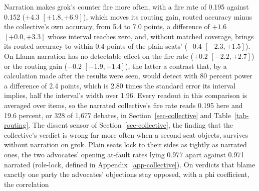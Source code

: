 Narration makes grok's counter fire more often, with a fire rate of 0.195 against
0.152 ($+4.3$ $[+1.8, +6.9]$), which moves its routing gain, routed accuracy
minus the collective's own accuracy, from 5.4 to 7.0
points, a difference of $+1.6$ $[+0.0, +3.3]$ whose interval reaches zero,
and, without matched coverage, brings its routed accuracy to within 0.4 points
of the plain seats' ($-0.4$ $[-2.3, +1.5]$). On Llama narration has no
detectable effect on the fire rate ($+0.2$ $[-2.2, +2.7]$) or the routing gain
($-0.2$ $[-1.9, +1.4]$), the latter a contrast that, by a calculation made
after the results were seen, would detect with 80 percent power a difference
of 2.4 points, which is 2.80 times the standard error its interval implies,
half the interval's width over 1.96.
Every readout in this comparison is averaged over items, so the narrated
collective's fire rate reads 0.195 here and 19.6 percent, or 328 of 1,677
debates, in Section~\ref{sec-collective} and Table~\ref{tab-routing}.
The dissent sensor of Section~\ref{sec-collective}, the finding that the
collective's verdict is wrong far more often when a second seat objects,
survives without narration on grok. Plain seats lock to their sides as
tightly as narrated ones, the two advocates' opening at-fault rates lying
0.977 apart against 0.971 narrated (role-lock, defined in
Appendix~\ref{app-collective}). On verdicts that blame exactly one party the
advocates' objections stay opposed, with a phi coefficient, the correlation
